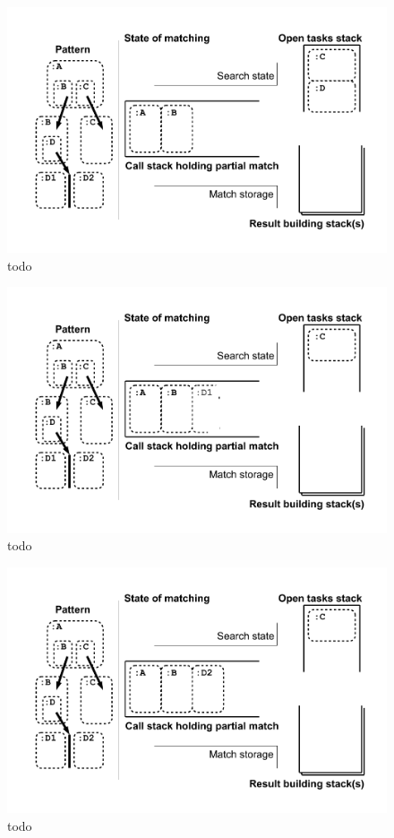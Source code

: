 \begin{figure}[htbp]
  \centering
  \includegraphics[width=\textwidth]{fig/Passungszustand5}
  \caption{todo}
  \label{figmatchingstate5}
\end{figure}

\begin{figure}[htbp]
  \centering
  \includegraphics[width=\textwidth]{fig/Passungszustand6}
  \caption{todo}
  \label{figmatchingstate6}
\end{figure}

\begin{figure}[htbp]
  \centering
  \includegraphics[width=\textwidth]{fig/Passungszustand7}
  \caption{todo}
  \label{figmatchingstate7}
\end{figure}

